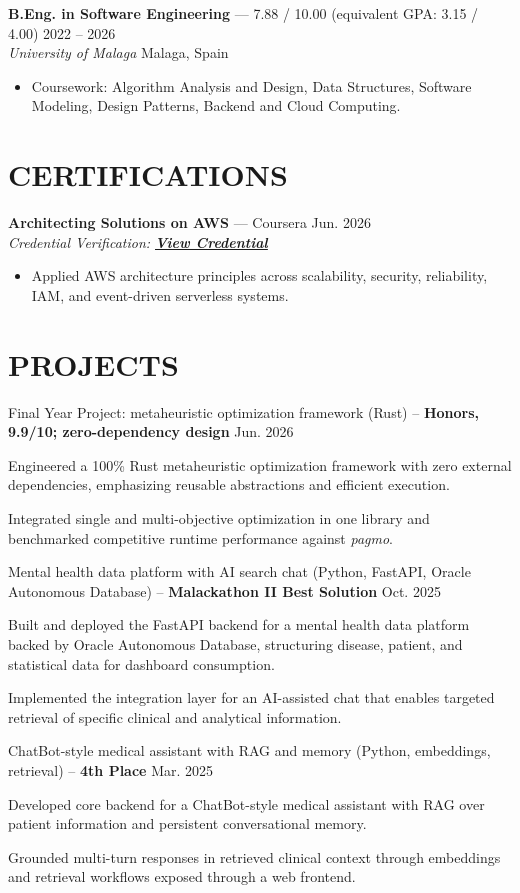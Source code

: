 \documentclass[10pt,a4paper]{article}
\newcommand{\dateright}[1]{\hfill{\color{customgray}#1}}
\newcommand{\locationright}[1]{\hfill{\color{customgray}#1}}
\newcommand{\ul}[1]{\underline{#1}}
\newcommand{\hlink}[2]{\href{#1}{\color{linkblue}\ul{\textbf{#2}}}}
\newcommand{\cveducation}[6]{%
  \textbf{#1} --- {#2} \dateright{#3}\\
  \textit{#4} \locationright{#5}
  \begin{itemize}
    #6
  \end{itemize}
}
\newcommand{\cvcertification}[5]{%
  \textbf{#1} --- {#2} \dateright{#3}\\
  \textit{Credential Verification: \hlink{#4}{View Credential}}
  \begin{itemize}
    #5
  \end{itemize}
}
\begin{document}
\cveducation
    {B.Eng. in Software Engineering}
    {7.88 / 10.00 (equivalent GPA: 3.15 / 4.00)}
    {2022 -- 2026}
    {University of Malaga}
    {Malaga, Spain}
    {
        \item Coursework: Algorithm Analysis and Design, Data Structures, Software Modeling, Design Patterns, Backend and Cloud Computing.
    }

\section{CERTIFICATIONS}

\cvcertification
    {Architecting Solutions on AWS}
    {Coursera}
    {Jun. 2026}
    {https://www.coursera.org/account/accomplishments/verify/E5Q4AG7TJ23T}
    {
        \item Applied AWS architecture principles across scalability, security, reliability, IAM, and event-driven serverless systems.
    }

\section{PROJECTS}
    {Final Year Project: metaheuristic optimization framework (Rust) -- \textbf{Honors, 9.9/10; zero-dependency design}}
    {Jun. 2026}
{
    \item Engineered a 100\% Rust metaheuristic optimization framework with zero external dependencies, emphasizing reusable abstractions and efficient execution.
    \item Integrated single and multi-objective optimization in one library and benchmarked competitive runtime performance against \textit{pagmo}.
}

    {Mental health data platform with AI search chat (Python, FastAPI, Oracle Autonomous Database) -- \textbf{Malackathon II Best Solution}}
    {Oct. 2025}
    {
        \item Built and deployed the FastAPI backend for a mental health data platform backed by Oracle Autonomous Database, structuring disease, patient, and statistical data for dashboard consumption.
        \item Implemented the integration layer for an AI-assisted chat that enables targeted retrieval of specific clinical and analytical information.
    }

    {ChatBot-style medical assistant with RAG and memory (Python, embeddings, retrieval) -- \textbf{4th Place}}
    {Mar. 2025}
    {
        \item Developed core backend for a ChatBot-style medical assistant with RAG over patient information and persistent conversational memory.
        \item Grounded multi-turn responses in retrieved clinical context through embeddings and retrieval workflows exposed through a web frontend.
    }
\end{document}
